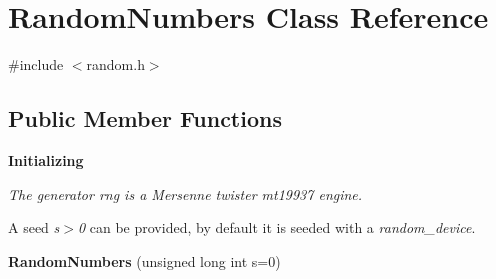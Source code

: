 \hypertarget{classRandomNumbers}{}\section{Random\+Numbers Class Reference}
\label{classRandomNumbers}


{\ttfamily \#include $<$random.\+h$>$}

\subsection*{Public Member Functions}
\begin{Indent}\textbf{ Initializing}\par
{\em The generator rng is a Mersenne twister {\itshape mt19937} engine.

A seed {\itshape s$>$0} can be provided, by default it is seeded with a {\itshape random\+\_\+device}. }\begin{DoxyCompactItemize}
\item 
\mbox{\label{classRandomNumbers_aeceac66b253ad00f58e7b2252f18f609}} 
{\bfseries Random\+Numbers} (unsigned long int s=0)
\end{DoxyCompactItemize}
\end{Indent}
